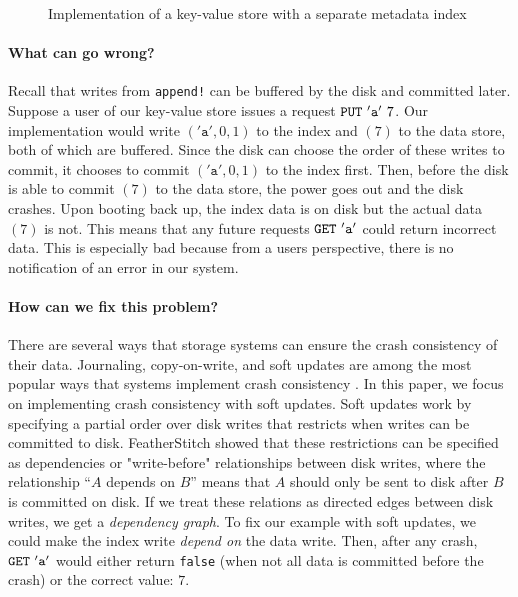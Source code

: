 
\begin{figure}[h]
  \centering
  \vspace{-.5em}
  \caption{Implementation of a key-value store with a separate metadata index}
  \label{fig:kv-single-index}
\end{figure}

\paragraph{What can go wrong?}
Recall that writes from \texttt{append!} can be buffered by the disk and committed later.
Suppose a user of our key-value store issues a request $\texttt{PUT}\ '\texttt{a}' \ 7$.
Our implementation would write $('\texttt{a}', 0, 1)$ to the index and $(7)$ to the data store, both of which are
buffered. Since the disk can choose the order of these writes to commit, it chooses to commit
$('\texttt{a}', 0, 1)$ to the index first. Then, before the disk is able to commit $(7)$ to the data store, the
power goes out and the disk crashes. Upon booting back up, the index data is on disk but the actual data $(7)$ is not.
This means that any future requests $\texttt{GET}\ '\texttt{a}'$ could return incorrect data. This is especially bad
because from a users perspective, there is no notification of an error in our system.

\paragraph{How can we fix this problem?}
There are several ways that storage systems can ensure the crash consistency of their data.
Journaling, copy-on-write, and soft updates are among the most popular ways that systems
implement crash consistency . In this paper, we focus on implementing crash consistency
with soft updates. Soft updates work by specifying a partial order over disk writes that restricts
when writes can be committed to disk. FeatherStitch  showed that these restrictions can be
specified as dependencies or "write-before" relationships between disk writes, where the relationship
``$A$ depends on $B$'' means that $A$ should only be sent to disk after $B$ is committed on disk.
If we treat these relations as directed edges between disk writes, we get a \textit{dependency graph}.
To fix our example with soft updates, we could make the index write \textit{depend on} the data write.
Then, after any crash, $\texttt{GET}\ '\texttt{a}'$ would either return \texttt{false} (when not all data is committed
before the crash) or the correct value: $7$.

